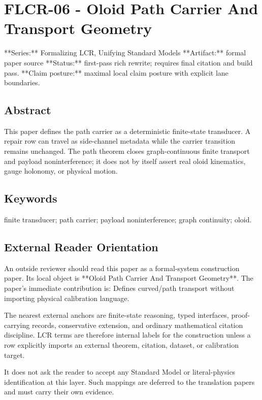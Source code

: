\documentclass[11pt]{article}
\begin{document}
\section*{FLCR-06 - Oloid Path Carrier And Transport Geometry}

**Series:** Formalizing LCR, Unifying Standard Models
**Artifact:** formal paper source
**Status:** first-pass rich rewrite; requires final citation and build pass.
**Claim posture:** maximal local claim posture with explicit lane boundaries.

\subsection*{Abstract}

This paper defines the path carrier as a deterministic finite-state transducer. A repair row can travel as side-channel metadata while the carrier transition remains unchanged. The path theorem closes graph-continuous finite transport and payload noninterference; it does not by itself assert real oloid kinematics, gauge holonomy, or physical motion.

\subsection*{Keywords}

finite transducer; path carrier; payload noninterference; graph continuity; oloid.

\subsection*{External Reader Orientation}

An outside reviewer should read this paper as a formal-system construction paper. Its local object is **Oloid Path Carrier And Transport Geometry**. The paper's immediate contribution is: Defines curved/path transport without importing physical calibration language.

The nearest external anchors are finite-state reasoning, typed interfaces, proof-carrying records, conservative extension, and ordinary mathematical citation discipline. LCR terms are therefore internal labels for the construction unless a row explicitly imports an external theorem, citation, dataset, or calibration target.

It does not ask the reader to accept any Standard Model or literal-physics identification at this layer. Such mappings are deferred to the translation papers and must carry their own evidence.
\end{document}
